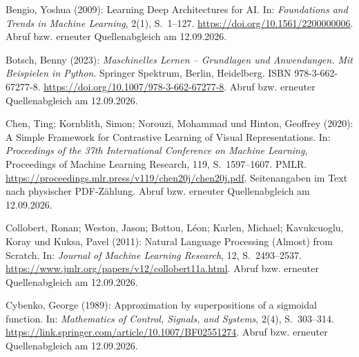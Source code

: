 \par\smallskip
\begin{samepage}
\noindent
Bengio, Yoshua (2009):
Learning Deep Architectures for AI.
In: \textit{Foundations and Trends in Machine Learning}, 2(1), S.~1--127.
\url{https://doi.org/10.1561/2200000006}.
Abruf bzw. erneuter Quellenabgleich am 12.09.2026.
\par\end{samepage}
\par\smallskip
\begin{samepage}
\noindent
Botsch, Benny (2023):
\textit{Maschinelles Lernen -- Grundlagen und Anwendungen. Mit Beispielen in Python}.
Springer Spektrum, Berlin, Heidelberg.
ISBN 978-3-662-67277-8.
\url{https://doi.org/10.1007/978-3-662-67277-8}.
Abruf bzw. erneuter Quellenabgleich am 12.09.2026.
\par\end{samepage}
\par\smallskip
\begin{samepage}
\noindent
Chen, Ting; Kornblith, Simon; Norouzi, Mohammad und Hinton, Geoffrey (2020):
A Simple Framework for Contrastive Learning of Visual Representations.
In: \textit{Proceedings of the 37th International Conference on Machine Learning},
Proceedings of Machine Learning Research, 119, S.~1597--1607.
PMLR.
\url{https://proceedings.mlr.press/v119/chen20j/chen20j.pdf}. Seitenangaben im Text nach physischer PDF-Zählung.
Abruf bzw. erneuter Quellenabgleich am 12.09.2026.
\par\end{samepage}
\par\smallskip
\begin{samepage}
\noindent
Collobert, Ronan; Weston, Jason; Bottou, Léon; Karlen, Michael;
Kavukcuoglu, Koray und Kuksa, Pavel (2011):
Natural Language Processing (Almost) from Scratch.
In: \textit{Journal of Machine Learning Research}, 12, S.~2493--2537.
\url{https://www.jmlr.org/papers/v12/collobert11a.html}.
Abruf bzw. erneuter Quellenabgleich am 12.09.2026.
\par\end{samepage}
\par\smallskip
\begin{samepage}
\noindent
Cybenko, George (1989):
Approximation by superpositions of a sigmoidal function.
In: \textit{Mathematics of Control, Signals, and Systems},
2(4), S.~303--314.
\url{https://link.springer.com/article/10.1007/BF02551274}.
Abruf bzw. erneuter Quellenabgleich am 12.09.2026.
\par\end{samepage}

